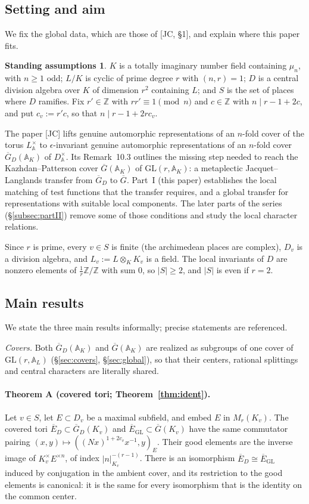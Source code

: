 \documentclass[12pt]{article}
\newcommand{\ov}[1]{\overline{#1}}
\newcommand{\eps}{\epsilon}
\newcommand{\A}{\mathbb{A}}
\newcommand{\Z}{\mathbb{Z}}
\newcommand{\GL}{\mathrm{GL}}
\newcommand{\Gb}{\ov{G}}
\newcommand{\GDb}{\ov{G}_D}
\newcommand{\Eb}{\ov{E}}
\theoremstyle{plain}
\theoremstyle{definition}
\newtheorem{assumption}[theorem]{Standing assumptions}
\begin{document}
\subsection{Setting and aim}
We fix the global data, which are those of [JC, \S1], and explain where this paper fits.

\begin{assumption}\label{ass:standing}
$K$ is a totally imaginary number field containing $\mu_n$, with $n\ge1$ odd; $L/K$ is cyclic of prime degree $r$ with $(n,r)=1$; $D$ is a central division algebra over $K$ of dimension $r^2$ containing $L$; and $S$ is the set of places where $D$ ramifies. Fix $r'\in\Z$ with $rr'\equiv1\pmod n$ and $c\in\Z$ with $n\mid r-1+2c$, and put $c_v:=r'c$, so that $n\mid r-1+2rc_v$.
\end{assumption}

The paper [JC] lifts genuine automorphic representations of an $n$-fold cover of the torus $L^\times_{\A}$ to $\eps$-invariant genuine automorphic representations of an $n$-fold cover $\GDb(\A_K)$ of $D^\times_{\A}$. Its Remark~10.3 outlines the missing step needed to reach the Kazhdan--Patterson cover $\Gb(\A_K)$ of $\GL(r,\A_K)$: a metaplectic Jacquet--Langlands transfer from $\GDb$ to $\Gb$. Part~I (this paper) establishes the local matching of test functions that the transfer requires, and a global transfer for representations with suitable local components. The later parts of the series (\S\ref{subsec:partII}) remove some of those conditions and study the local character relations.

Since $r$ is prime, every $v\in S$ is finite (the archimedean places are complex), $D_v$ is a division algebra, and $L_v:=L\otimes_KK_v$ is a field. The local invariants of $D$ are nonzero elements of $\frac1r\Z/\Z$ with sum $0$, so $|S|\ge2$, and $|S|$ is even if $r=2$.

\subsection{Main results}\label{subsec:mainresults}
We state the three main results informally; precise statements are referenced.

\emph{Covers.} Both $\GDb(\A_K)$ and $\Gb(\A_K)$ are realized as subgroups of one cover of $\GL(r,\A_L)$ (\S\ref{sec:covers}, \S\ref{sec:global}), so that their centers, rational splittings and central characters are literally shared.

\paragraph{Theorem A (covered tori; Theorem~\ref{thm:ident}).} Let $v\in S$, let $E\subset D_v$ be a maximal subfield, and embed $E$ in $M_r(K_v)$. The covered tori $\Eb_D\subset\GDb(K_v)$ and $\Eb_{\GL}\subset\Gb(K_v)$ have the same commutator pairing $(x,y)\mapsto((Nx)^{1+2c_v}x^{-1},y)_E$. Their good elements are the inverse image of $K_v^\times E^{\times n}$, of index $|n|_{K_v}^{-(r-1)}$. There is an isomorphism $\Eb_D\cong\Eb_{\GL}$ induced by conjugation in the ambient cover, and its restriction to the good elements is canonical: it is the same for every isomorphism that is the identity on the common center.
\end{document}
